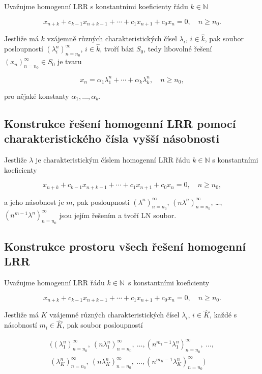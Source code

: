 Uvažujme homogenní LRR s konstantními koeficienty řádu $k \in \mathbb{N}$

\[ x_{n+k} + c_{k-1} x_{n+k-1} + \cdots + c_1 x_{n+1} + c_0 x_{n} = 0, \quad n \geq n_0. \]

\noindent Jestliže má $k$ vzájemně různých charakteristických čísel $\lambda_i$, $i\in\hat{k}$, pak soubor posloupností $(\lambda_i^n)_{n=n_0}^\infty$, $i\in\hat{k}$, tvoří bázi $S_0$, tedy libovolné řešení $(x_n)_{n=n_0}^\infty \in S_0$ je tvaru

\[ x_n = \alpha_1 \lambda_1^n + \cdots + \alpha_k \lambda_k^n, \quad n \geq n_0, \]

\noindent pro nějaké konstanty $\alpha_1, \ldots, \alpha_k$.

\subsection*{Konstrukce řešení homogenní LRR pomocí charakteristického čísla vyšší násobnosti}

Jestliže $\lambda$ je charakteristickým číslem homogenní LRR řádu
$k\in\mathbb{N}$ s konstantními koeficienty

\[ x_{n+k} + c_{k-1} x_{n+k-1} + \cdots + c_1 x_{n+1} + c_0 x_{n} = 0, \quad n \geq n_0, \]

\noindent a jeho násobnost je $m$, pak posloupnosti $(\lambda^n)_{n=n_0}^\infty$, $(n\lambda^n)_{n=n_0}^\infty$, \ldots, $(n^{m-1}\lambda^n)_{n=n_0}^\infty$ jsou jejím řešením a tvoří LN soubor.

\subsection*{Konstrukce prostoru všech řešení homogenní LRR}

Uvažujme homogenní LRR řádu $k \in \mathbb{N}$~s konstantními koeficienty

\[ x_{n+k} + c_{k-1} x_{n+k-1} + \cdots + c_1 x_{n+1} + c_0 x_{n} = 0, \quad n \geq n_0. \]

\noindent Jestliže má $K$ vzájemně různých charakteristických čísel $\lambda_i$, $i\in\hat{K}$, každé s násobností $m_i \in \hat{K}$, pak soubor posloupností

\begin{gather}
    \Big( (\lambda_1^n)_{n=n_0}^\infty, \ (n\lambda_1^n)_{n=n_0}^\infty, \ \ldots, (n^{m_1-1} \lambda_1^n)_{n=n_0}^\infty, \ \ldots, \\  (\lambda_K^n)_{n=n_0}^\infty, \ (n\lambda_K^n)_{n=n_0}^\infty, \ \ldots, (n^{m_K-1} \lambda_K^n)_{n=n_0}^\infty \Big)
\end{gather}

